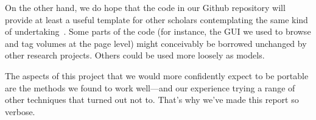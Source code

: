 \documentclass[paper=a4, fontsize=12pt]{scrartcl}
\numberwithin{equation}{section}		%
\numberwithin{figure}{section}			%
\numberwithin{table}{section}				%
\begin{document}
On the other hand, we do hope that the code in our Github repository will provide at least a useful template for other scholars contemplating the same kind of undertaking~\cite{underwood:genrerepo}. Some parts of the code (for instance, the GUI we used to browse and tag volumes at the page level) might conceivably be borrowed unchanged by other research projects. Others could be used more loosely as models.

The aspects of this project that we would more confidently expect to be portable are the methods we found to work well---and our experience trying a range of other techniques that turned out not to. That's why we've made this report so verbose.

\newpage



\end{document}
